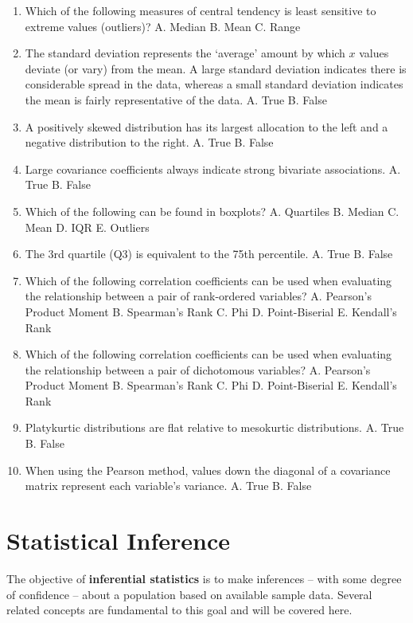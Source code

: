 \documentclass[]{book}
\begin{document}
\begin{enumerate}
\def\labelenumi{\arabic{enumi}.}
\item
  Which of the following measures of central tendency is least sensitive to extreme values (outliers)?
  A. Median
  B. Mean
  C. Range
\item
  The standard deviation represents the `average' amount by which \(x\) values deviate (or vary) from the mean. A large standard deviation indicates there is considerable spread in the data, whereas a small standard deviation indicates the mean is fairly representative of the data.
  A. True
  B. False
\item
  A positively skewed distribution has its largest allocation to the left and a negative distribution to the right.
  A. True
  B. False
\item
  Large covariance coefficients always indicate strong bivariate associations.
  A. True
  B. False
\item
  Which of the following can be found in boxplots?
  A. Quartiles
  B. Median
  C. Mean
  D. IQR
  E. Outliers
\item
  The 3rd quartile (Q3) is equivalent to the 75th percentile.
  A. True
  B. False
\item
  Which of the following correlation coefficients can be used when evaluating the relationship between a pair of rank-ordered variables?
  A. Pearson's Product Moment
  B. Spearman's Rank
  C. Phi
  D. Point-Biserial
  E. Kendall's Rank
\item
  Which of the following correlation coefficients can be used when evaluating the relationship between a pair of dichotomous variables?
  A. Pearson's Product Moment
  B. Spearman's Rank
  C. Phi
  D. Point-Biserial
  E. Kendall's Rank
\item
  Platykurtic distributions are flat relative to mesokurtic distributions.
  A. True
  B. False
\item
  When using the Pearson method, values down the diagonal of a covariance matrix represent each variable's variance.
  A. True
  B. False
\end{enumerate}

\hypertarget{inf-stats}{%
\chapter{Statistical Inference}\label{inf-stats}}

The objective of \textbf{inferential statistics} is to make inferences -- with some degree of confidence -- about a population based on available sample data. Several related concepts are fundamental to this goal and will be covered here.
\end{document}
